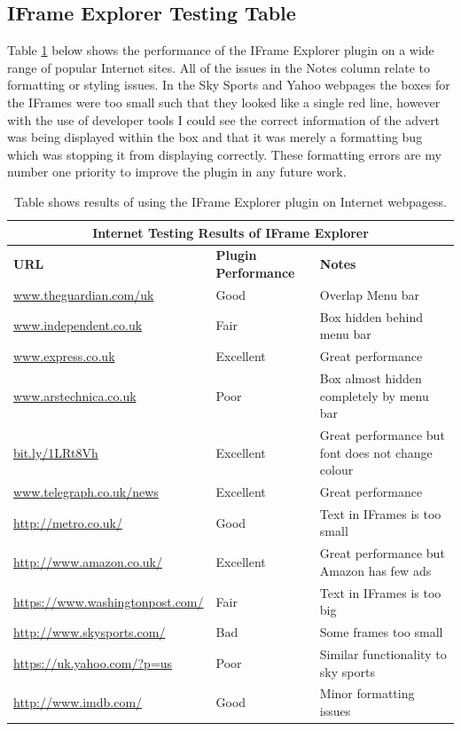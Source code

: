 \documentclass[12pt]{article}
\begin{document}
\subsection{IFrame Explorer Testing Table}  \label{iETesting}
Table \ref{table:4} below shows the performance of the IFrame Explorer plugin on a wide range of popular Internet sites. All of the issues in the Notes column relate to formatting or styling issues. In the Sky Sports and Yahoo webpages the boxes for the IFrames were too small such that they looked like a single red line, however with the use of developer tools I could see the correct information of the advert was being displayed within the box and that it was merely a formatting bug which was stopping it from displaying correctly. These formatting errors are my number one priority to improve the plugin in any future work. 

{
\begin{table} [H]
\centering
\begin{tabular}{ |p{5cm}|p{5cm}|p{5cm}|  }
\hline
\multicolumn{3}{|c|}{\textbf{Internet Testing Results of IFrame Explorer}} \\
\hline
\textbf{URL} & \textbf{Plugin Performance} & \textbf{Notes} \\
\hline
\url{www.theguardian.com/uk} & Good & Overlap Menu bar \\
\hline
\url{www.independent.co.uk} & Fair & Box hidden behind menu bar \\
\hline
\url{www.express.co.uk} & Excellent & Great performance \\
\hline
\url{www.arstechnica.co.uk} & Poor & Box almost hidden completely by menu bar  \\
\hline
\url{bit.ly/1LRt8Vh} & Excellent & Great performance but font does not change colour \\
\hline
\url{www.telegraph.co.uk/news} & Excellent & Great performance   \\
\hline
\url{http://metro.co.uk/} & Good & Text in IFrames is too small \\
\hline
\url{http://www.amazon.co.uk/} & Excellent & Great performance but Amazon has few ads  \\
\hline
\url{https://www.washingtonpost.com/} & Fair & Text in IFrames is too big \\
\hline
\url{http://www.skysports.com/} & Bad & Some frames too small \\
\hline
\url{https://uk.yahoo.com/?p=us} & Poor & Similar functionality to sky sports \\
\hline
\url{http://www.imdb.com/} & Good & Minor formatting issues \\
\hline
\end{tabular}
\caption{Table shows results of using the IFrame Explorer plugin on Internet webpagess.}
\label{table:4}
\end{table}
}
\end{document}
